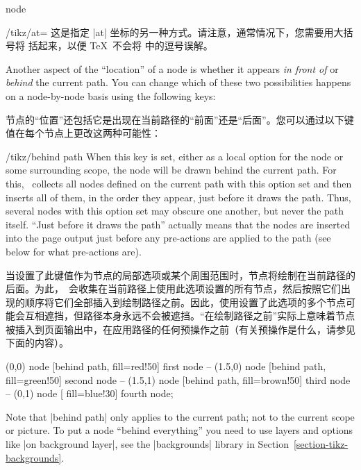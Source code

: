 \begin{pathoperation}{node}
\begin{key}{/tikz/at=}
        这是指定 |at| 坐标的另一种方式。请注意，通常情况下，您需要用大括号将  括起来，以便 \TeX\ 不会将  中的逗号误解。


    \end{key}

    Another aspect of the ``location'' of a node is whether it appears \emph{in
    front of} or \emph{behind} the current path. You can change which of these
    two possibilities happens on a node-by-node basis using the following keys:
    
    节点的“位置”还包括它是出现在当前路径的“前面”还是“后面”。您可以通过以下键值在每个节点上更改这两种可能性：

    \begin{key}{/tikz/behind path}
        When this key is set, either as a local option for the node or some
        surrounding scope, the node will be drawn behind the current path. For
        this, \tikzname\ collects all nodes defined on the current path with
        this option set and then inserts all of them, in the order they appear,
        just before it draws the path. Thus, several nodes with this option set
        may obscure one another, but never the path itself. ``Just before it
        draws the path'' actually means that the nodes are inserted into the
        page output just before any pre-actions are applied to the path (see
        below for what pre-actions are).

        当设置了此键值作为节点的局部选项或某个周围范围时，节点将绘制在当前路径的后面。为此，\tikzname\ 会收集在当前路径上使用此选项设置的所有节点，然后按照它们出现的顺序将它们全部插入到绘制路径之前。因此，使用设置了此选项的多个节点可能会互相遮挡，但路径本身永远不会被遮挡。“在绘制路径之前”实际上意味着节点被插入到页面输出中，在应用路径的任何预操作之前（有关预操作是什么，请参见下面的内容）。
\begin{codeexample}[]
\tikz \fill [fill=blue!50, draw=blue, very thick]
      (0,0)   node [behind path, fill=red!50]   {first node}
   -- (1.5,0) node [behind path, fill=green!50] {second node}
   -- (1.5,1) node [behind path, fill=brown!50] {third node}
   -- (0,1)   node [             fill=blue!30]  {fourth node};
\end{codeexample}

        Note that |behind path| only applies to the current path; not to the
        current scope or picture. To put a node ``behind everything'' you need
        to use layers and options like |on background layer|, see the
        |backgrounds| library in Section~\ref{section-tikz-backgrounds}.


\end{key}
\end{pathoperation}
